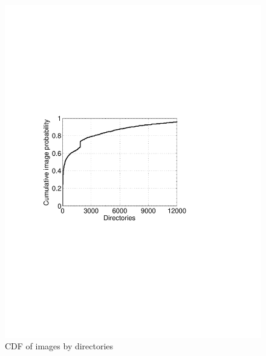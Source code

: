 \begin{figure}
	\centering
	\begin{minipage}{0.26\textwidth}
		\centering
		\includegraphics[width=1\textwidth]{graphs/dir.pdf}
		\caption{CDF of images by directories}
		\label{fig-dir}
	\end{minipage}%
	\begin{minipage}{0.24\textwidth}
		\centering

\end{minipage}
\end{figure}
